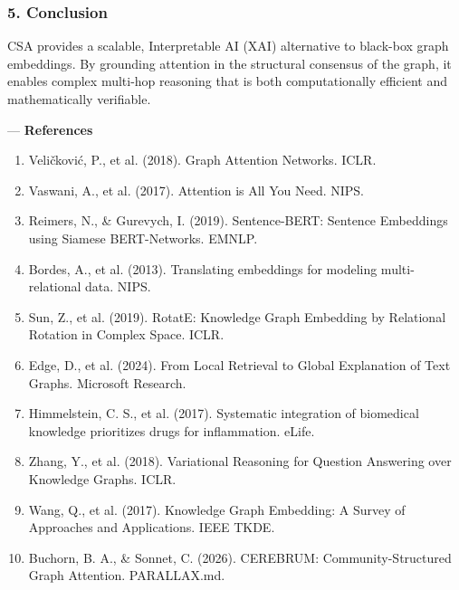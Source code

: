 \subsubsection{5. Conclusion}
CSA provides a scalable, Interp\-retable AI (XAI) alternative to black-box graph embeddings. By grounding attention in the structural consensus of the graph, it enables complex multi-hop reasoning that is both compu\-tationally efficient and mathe\-matically verifiable.

---
\textbf{References}
\begin{enumerate}
\item Veličković, P., et al. (2018). Graph Attention Networks. ICLR.
\item Vaswani, A., et al. (2017). Attention is All You Need. NIPS.
\item Reimers, N., \& Gurevych, I. (2019). Sentence-BERT: Sentence Embeddings using Siamese BERT-Networks. EMNLP.
\item Bordes, A., et al. (2013). Translating embeddings for modeling multi-relational data. NIPS.
\item Sun, Z., et al. (2019). RotatE: Knowledge Graph Embedding by Relational Rotation in Complex Space. ICLR.
\item Edge, D., et al. (2024). From Local Retrieval to Global Explanation of Text Graphs. Microsoft Research.
\item Himmelstein, C. S., et al. (2017). Systematic integration of biomedical knowledge prioritizes drugs for infla\-mmation. eLife.
\item Zhang, Y., et al. (2018). Variational Reasoning for Question Answering over Knowledge Graphs. ICLR.
\item Wang, Q., et al. (2017). Knowledge Graph Embedding: A Survey of Approaches and Applic\-ations. IEEE TKDE.
\item Buchorn, B. A., \& Sonnet, C. (2026). CEREBRUM: Community-Structured Graph Attention. PARALLAX.md.

\end{enumerate}